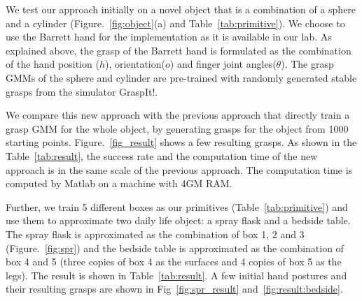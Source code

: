 We test our approach initially on a novel object that is a combination of a sphere and a cylinder (Figure.~\ref{fig:object}(a) and Table~\ref{tab:primitive}). We choose to use the Barrett hand for the implementation as it is available in our lab. As explained above, the grasp of the Barrett hand is formulated as the combination of the hand position ($h$), orientation($o$) and finger joint angles($\theta$).  The grasp GMMs of the sphere and cylinder are pre-trained with randomly generated stable grasps from the simulator GraspIt!.

We compare this new approach with the previous approach that directly train a grasp GMM for the whole object, by generating grasps for the object from 1000 starting points. Figure.~\ref{fig_result} shows a few resulting grasps. As shown in the Table~\ref{tab:result}, the success rate and the computation time of the new approach is in the same scale of the previous approach. The computation time is computed by Matlab on a machine with 4GM RAM.

Further, we train 5 different boxes as our primitives (Table~\ref{tab:primitive}) and use them to approximate two daily life object: a spray flask and a bedside table. The spray flask is approximated as the combination of box 1, 2 and 3 (Figure.~\ref{fig:spr}) and the bedside table is approximated as the combination of box 4 and 5 (three copies of box 4 as the surfaces and 4 copies of box 5 as the legs). The result is shown in Table~\ref{tab:result}. A few initial hand postures and their resulting grasps are shown in Fig~\ref{fig:spr_result} and~\ref{fig:result:bedside}.

